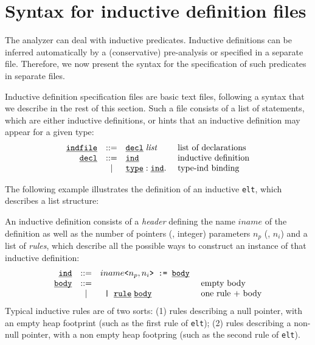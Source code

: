 \section{Syntax for inductive definition files}
\label{s:3:3:ind}
The \memcad analyzer can deal with inductive predicates.
Inductive definitions can be inferred automatically by a (conservative)
pre-analysis or specified in a separate file.
Therefore, we now present the syntax for the specification of such
predicates in separate files.

Inductive definition specification files are basic text files, following
a syntax that we describe in the rest of this section.
Such a file consists of a list of statements, which are either
inductive definitions, or hints that an inductive definition may
appear for a given type:
\[
\begin{array}{rcll}
  \underline{\smash{\texttt{indfile}}}
  & ::=
  & \underline{\smash{\texttt{decl}}} \; \text{{\em list}}
  & \text{ list of declarations}
  \\
  \underline{\smash{\texttt{decl}}}
  & ::=
  & \underline{\smash{\texttt{ind}}}
  & \text{ inductive definition}
  \\
  & |
  & \underline{\smash{\texttt{type}}} : \underline{\smash{\texttt{ind}}} .
  & \text{ type-ind binding}
  \\
\end{array}
\]

The following example illustrates the definition of an inductive
\texttt{elt}, which describes a list structure:


An inductive definition consists of a {\em header} defining the name
\( iname \) of the definition as well as the number of pointers
(\resp, integer) parameters \( n_p \) (\resp, \( n_i \)) and a list
of {\em rules}, which describe all the possible ways to construct an
instance of that inductive definition:
\[
\begin{array}{rcll}
  \underline{\smash{\texttt{ind}}}
  & ::=
  & iname \texttt{<} n_p, n_i \texttt{> := } \underline{\smash{\texttt{body}}}
  &
  \\
  \underline{\smash{\texttt{body}}}
  & ::=
  &
  & \text{ empty body}
  \\
  & |
  & \texttt{ | } \underline{\smash{\texttt{rule}}} \; \underline{\smash{\texttt{body}}}
  & \text{ one rule + body}
  \\
\end{array}
\]
Typical inductive rules are of two sorts:
(1) rules describing a null pointer, with an empty heap footprint
(such as the first rule of \texttt{elt});
(2) rules describing a non-null pointer, with a non empty heap footpring
(such as the second rule of \texttt{elt}).

